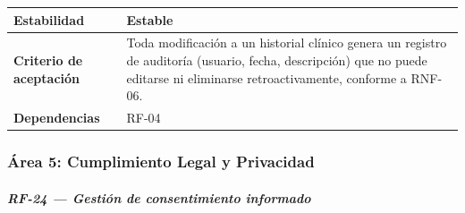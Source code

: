 \documentclass[
]{article}
\newcounter{none} %
\begin{document}
{\def\LTcaptype{none} %
\begin{longtable}[]{@{}
  >{\raggedright\arraybackslash}p{}
  >{\raggedright\arraybackslash}p{}@{}}
\toprule\noalign{}
\begin{minipage}[b]{\linewidth}\raggedright
\textbf{Estabilidad}
\end{minipage} & \begin{minipage}[b]{\linewidth}\raggedright
Estable
\end{minipage} \\
\midrule\noalign{}
\endhead
\bottomrule\noalign{}
\endlastfoot
\textbf{Criterio de aceptación} &
\begin{minipage}[t]{\linewidth}\raggedright
Toda modificación a un historial clínico genera un registro de auditoría
(usuario, fecha, descripción) que no puede editarse ni eliminarse
retroactivamente, conforme a RNF-06.
\end{minipage} \\
\textbf{Dependencias} & \begin{minipage}[t]{\linewidth}\raggedright
RF-04
\end{minipage} \\
\end{longtable}
}

\subsubsection{Área 5: Cumplimiento Legal y
Privacidad}\label{uxe1rea-5-cumplimiento-legal-y-privacidad}

\subparagraph{RF-24 --- Gestión de consentimiento
informado}\label{rf-24-gestion-de-consentimiento-informado}
\end{document}
